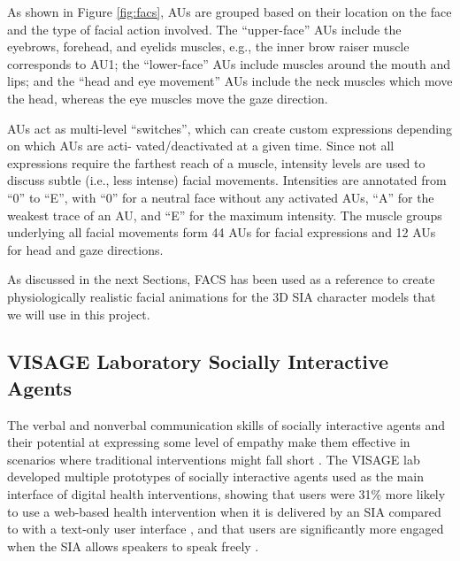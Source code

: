 \documentclass[12pt]{article}
\begin{document}
As shown in Figure \ref{fig:facs}, AUs
are grouped based on their location on the face and the
type of facial action involved. The “upper-face” AUs include
the eyebrows, forehead, and eyelids muscles, e.g., the inner
brow raiser muscle corresponds to AU1; the “lower-face”
AUs include muscles around the mouth and lips; and the
“head and eye movement” AUs include the neck muscles
which move the head, whereas the eye muscles move the
gaze direction.

AUs act as multi-level “switches”, which can create
custom expressions depending on which AUs are acti-
vated/deactivated at a given time. Since not all expressions
require the farthest reach of a muscle, intensity levels are
used to discuss subtle (i.e., less intense) facial movements.
Intensities are annotated from “0” to “E”, with “0” for a
neutral face without any activated AUs, “A” for the weakest
trace of an AU, and “E” for the maximum intensity.
The muscle groups underlying all facial movements
form 44 AUs for facial expressions and 12 AUs for head
and gaze directions.  

As discussed in the next Sections, FACS has been used as a reference to create physiologically realistic facial animations for the 3D SIA character models that we will use in this project.


\subsection{VISAGE Laboratory Socially Interactive Agents}

The verbal and nonverbal communication skills  of  socially interactive agents and their potential at expressing some level of empathy make them effective in scenarios where traditional interventions might fall short \cite{Lisetti2013}.  
The VISAGE lab developed multiple prototypes of socially interactive agents used as the main interface of digital health interventions, showing that users were  31\% more likely to use a web-based health intervention when it is delivered by an SIA compared to with a text-only user interface \cite{Lisetti2013}, and that users are significantly more engaged when the SIA allows speakers to speak freely \cite{LisettiNowExperience}\cite{Yasavur2014}. 
\end{document}
